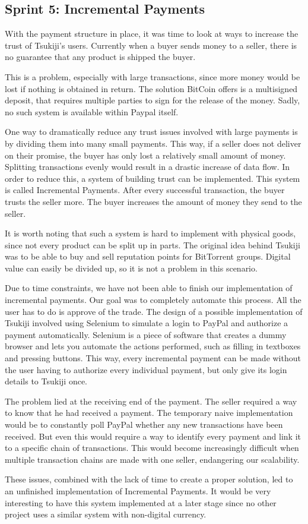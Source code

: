 \subsection{Sprint 5: Incremental Payments}
\label{incpay}
With the payment structure in place, it was time to look at ways to increase the trust of Tsukiji's users.
Currently when a buyer sends money to a seller, there is no guarantee that any product is shipped the buyer.

This is a problem, especially with large transactions, since more money would be lost if nothing is obtained in return.
The solution BitCoin offers is a multisigned deposit, that requires multiple parties to sign for the release of the money.
Sadly, no such system is available within Paypal itself.

One way to dramatically reduce any trust issues involved with large payments is by dividing them into many small payments.
This way, if a seller does not deliver on their promise, the buyer has only lost a relatively small amount of money.
Splitting transactions evenly would result in a drastic increase of data flow. 
In order to reduce this, a system of building trust can be implemented.
This system is called Incremental Payments.
After every successful transaction, the buyer trusts the seller more.
The buyer increases the amount of money they send to the seller.

It is worth noting that such a system is hard to implement with physical goods, since not every product can be split up in parts.
The original idea behind Tsukiji was to be able to buy and sell reputation points for BitTorrent groups.
Digital value can easily be divided up, so it is not a problem in this scenario.

Due to time constraints, we have not been able to finish our implementation of incremental payments.
Our goal was to completely automate this process.
All the user has to do is approve of the trade.
The design of a possible implementation of Tsukiji involved using Selenium \cite{selenium} to simulate a login to PayPal and authorize a payment automatically.
Selenium is a piece of software that creates a dummy browser and lets you automate the actions performed, such as filling in textboxes and pressing buttons.
This way, every incremental payment can be made without the user having to authorize every individual payment, but only give its login details to Tsukiji once.
 
The problem lied at the receiving end of the payment.
The seller required a way to know that he had received a payment.
The temporary naive implementation would be to constantly poll PayPal whether any new transactions have been received.
But even this would require a way to identify every payment and link it to a specific chain of transactions.
This would become increasingly difficult when multiple transaction chains are made with one seller, endangering our scalability.

These issues, combined with the lack of time to create a proper solution, led to an unfinished implementation of Incremental Payments.
It would be very interesting to have this system implemented at a later stage since no other project uses a similar system with non-digital currency.